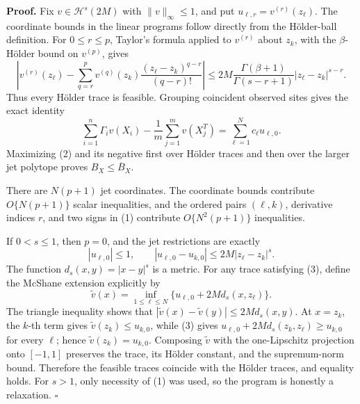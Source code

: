 \textbf{Proof.}
Fix \(v\in\mathcal H^s(2M)\) with \(\|v\|_\infty\le1\), and put \(u_{\ell,r}=v^{(r)}(z_\ell)\). The coordinate bounds in the linear programs follow directly from the H\"older-ball definition. For \(0\le r\le p\), Taylor's formula applied to \(v^{(r)}\) about \(z_k\), with the \(\beta\)-H\"older bound on \(v^{(p)}\), gives
\[
\left|v^{(r)}(z_\ell)-\sum_{q=r}^p
v^{(q)}(z_k)\frac{(z_\ell-z_k)^{q-r}}{(q-r)!}\right|
\le
2M\frac{\Gamma(\beta+1)}{\Gamma(s-r+1)}|z_\ell-z_k|^{s-r}.
\tag{1}
\]
Thus every H\"older trace is feasible. Grouping coincident observed sites gives the exact identity
\[
\sum_{i=1}^n\Gamma_i v(X_i)-\frac1m\sum_{j=1}^mv(X_j^T)
=\sum_{\ell=1}^Nc_\ell u_{\ell,0}.
\tag{2}
\]
Maximizing (2) and its negative first over H\"older traces and then over the larger jet polytope proves \(B_X\le\overline B_X\).

There are \(N(p+1)\) jet coordinates. The coordinate bounds contribute \(O\{N(p+1)\}\) scalar inequalities, and the ordered pairs \((\ell,k)\), derivative indices \(r\), and two signs in (1) contribute \(O\{N^2(p+1)\}\) inequalities.

If \(0<s\le1\), then \(p=0\), and the jet restrictions are exactly
\[
|u_{\ell,0}|\le1,
\qquad
|u_{\ell,0}-u_{k,0}|\le2M|z_\ell-z_k|^s.
\tag{3}
\]
The function \(d_s(x,y)=|x-y|^s\) is a metric. For any trace satisfying (3), define the McShane extension explicitly by
\[
\widetilde v(x)=\inf_{1\le\ell\le N}\{u_{\ell,0}+2M d_s(x,z_\ell)\}.
\]
The triangle inequality shows that \(|\widetilde v(x)-\widetilde v(y)|\le2M d_s(x,y)\). At \(x=z_k\), the \(k\)-th term gives \(\widetilde v(z_k)\le u_{k,0}\), while (3) gives \(u_{\ell,0}+2M d_s(z_k,z_\ell)\ge u_{k,0}\) for every \(\ell\); hence \(\widetilde v(z_k)=u_{k,0}\). Composing \(\widetilde v\) with the one-Lipschitz projection onto \([-1,1]\) preserves the trace, its H\"older constant, and the supremum-norm bound. Therefore the feasible traces coincide with the H\"older traces, and equality holds. For \(s>1\), only necessity of (1) was used, so the program is honestly a relaxation. \(\square\)